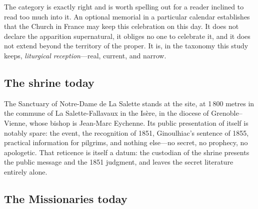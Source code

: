 The category is exactly right and is worth spelling out for a reader
inclined to read too much into it. An optional memorial in a
particular calendar establishes that the Church in France may keep
this celebration on this day. It does not declare the apparition
supernatural, it obliges no one to celebrate it, and it does not
extend beyond the territory of the proper. It is, in the taxonomy
this study keeps, \emph{liturgical reception}---real, current, and
narrow.

\subsection{The shrine today}

The Sanctuary of Notre-Dame de La Salette stands at the site, at
1\,800 metres in the commune of La Salette-Fallavaux in the Isère,
in the diocese of Grenoble--Vienne, whose bishop is Jean-Marc
Eychenne. Its public presentation of itself is notably spare: the
event, the recognition of 1851, Ginoulhiac's sentence of 1855,
practical information for pilgrims, and nothing else---no secret, no
prophecy, no apologetic. That reticence is itself a datum: the
custodian of the shrine presents the public message and the 1851
judgment, and leaves the secret literature entirely alone.

\subsection{The Missionaries today}


